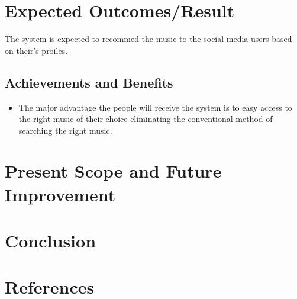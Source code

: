 \documentclass{article}
\begin{document}
\section{Expected Outcomes/Result}
The system is expected to recommed the music to the social media users based on their's proiles.
\subsection{Achievements and Benefits}
\begin{itemize}
	\item The major advantage the people will receive the system is to easy access to the right music of their choice eliminating the conventional method of searching the right music. 
\end{itemize}
\cleardoublepage

\section{Present Scope and Future Improvement}
\cleardoublepage

\section{Conclusion}
\cleardoublepage
\section*{References}


\nocite{*}
\end{document}
